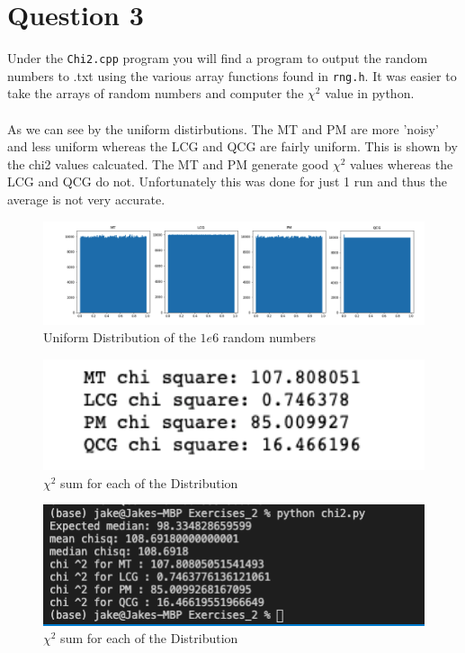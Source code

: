 \documentclass[12pt]{article}
\begin{document}
\section*{Question 3}
Under the \lstinline{Chi2.cpp} program you will find a program to output the random numbers to .txt using the various array functions found in \lstinline{rng.h}. It was easier to take the arrays of random numbers and computer the $\chi^2$ value in python. \\
\\
As we can see by the uniform distirbutions. The MT and PM are more 'noisy' and less uniform whereas the LCG and QCG are fairly uniform. This is shown by the chi2 values calcuated. The MT and PM generate good $\chi^2$ values whereas the LCG and QCG do not. Unfortunately this was done for just 1 run and thus the average is not very accurate.\\



\begin{figure}[h]
    \centering
    \includegraphics[width=15cm]{Uniform_dist.png}
    \caption{Uniform Distribution of the $1e6$ random numbers}

\end{figure}
\begin{figure}[h]
    \centering
    \includegraphics[width=15cm]{chi2.png}
    \caption{$\chi^2$ sum for each of the Distribution}

\end{figure}

\begin{figure}[h]
    \centering
    \includegraphics[width=15cm]{chisqm.png}
    \caption{$\chi^2$ sum for each of the Distribution}

\end{figure}
\end{document}
